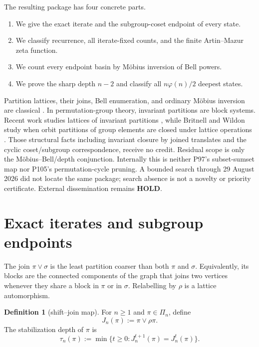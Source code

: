 \documentclass[11pt,a4paper]{amsart}
\theoremstyle{definition}
\newtheorem{definition}[theorem]{Definition}
\theoremstyle{remark}
\newcommand{\Pin}{\Pi_n}
\begin{document}
The resulting package has four concrete parts.
\begin{enumerate}
\item We give the exact iterate and the subgroup-coset endpoint of every
  state.
\item We classify recurrence, all iterate-fixed counts, and the finite
  Artin--Mazur zeta function.
\item We count every endpoint basin by M\"obius inversion of Bell powers.
\item We prove the sharp depth $n-2$ and classify all
  $n\varphi(n)/2$ deepest states.
\end{enumerate}

Partition lattices, their joins, Bell enumeration, and ordinary M\"obius
inversion are classical \cite{Stanley2011}.  In permutation-group theory,
invariant partitions are block systems.  Recent work studies lattices of
invariant partitions \cite{AnagnostopoulouMerkouriBaileyCameron2025}, while
Britnell and Wildon study when orbit partitions of group elements are closed
under lattice operations \cite{BritnellWildon2014}.  Those structural facts
including invariant closure by joined translates and the cyclic
coset/subgroup correspondence, receive no credit.  Residual scope is only
the M\"obius--Bell/depth conjunction.  Internally this is neither P97's
subset-sumset map nor P105's permutation-cycle pruning.  A bounded search
through 29 August 2026 did not locate the same package; search absence is not
a novelty or priority certificate.  External dissemination remains
\textbf{HOLD}.

\section{Exact iterates and subgroup endpoints}\label{sec:iterate}

The join $\pi\vee\sigma$ is the least partition coarser than both $\pi$ and
$\sigma$.  Equivalently, its blocks are the connected components of the
graph that joins two vertices whenever they share a block in $\pi$ or in
$\sigma$.  Relabelling by $\rho$ is a lattice automorphism.

\begin{definition}[shift--join map]
For $n\geq1$ and $\pi\in\Pin$, define
\begin{equation}\label{eq:update}
                  J_n(\pi):=\pi\vee\rho\pi .
\end{equation}
The stabilization depth of $\pi$ is
\[
 \tau_n(\pi):=\min\{t\geq0:J_n^{t+1}(\pi)=J_n^t(\pi)\}.
\]
\end{definition}
\end{document}
